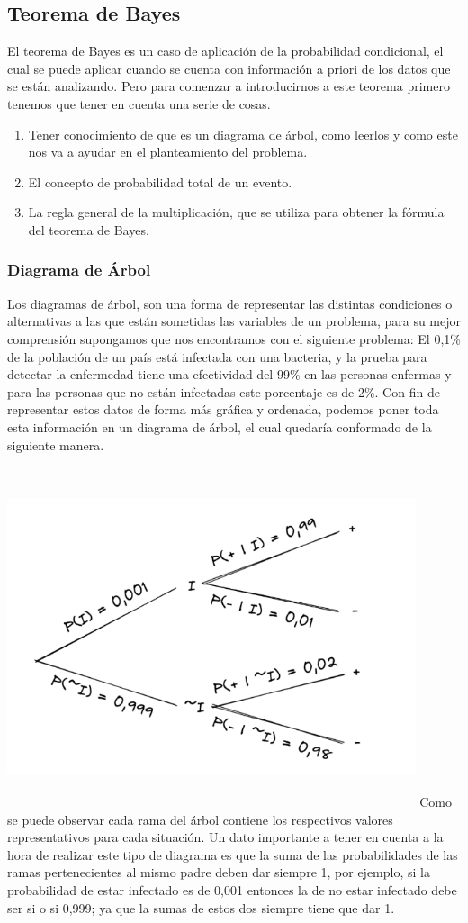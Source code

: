 \documentclass[]{article}
\begin{document}
\subsection{Teorema de Bayes}
El teorema de Bayes es un caso de aplicación de la probabilidad condicional, el cual se puede aplicar cuando se cuenta con información a priori de los datos que se están analizando. Pero para comenzar a introducirnos a este teorema primero tenemos que tener en cuenta una serie de cosas.
\begin{enumerate}
	\item Tener conocimiento de que es un diagrama de árbol, como leerlos y como este nos va a ayudar en el planteamiento del problema.
	\item El concepto de probabilidad total de un evento.
	\item La regla general de la multiplicación, que se utiliza para obtener la fórmula del teorema de Bayes.
\end{enumerate}
\subsubsection*{Diagrama de Árbol}
Los diagramas de árbol, son una forma de representar las distintas condiciones o alternativas a las que están sometidas las variables de un problema, para su mejor comprensión supongamos que nos encontramos con el siguiente problema:
El 0,1\% de la población de un país está infectada con una bacteria, y la prueba para detectar la enfermedad tiene una efectividad del 99\% en las personas enfermas y para las personas que no están infectadas este porcentaje es de 2\%.
Con fin de representar estos datos de forma más gráfica y ordenada, podemos poner toda esta información en un diagrama de árbol, el cual quedaría conformado de la siguiente manera.

\includegraphics[width=12cm, height=10cm]{imagenes/diagrama_arbol.png}
Como se puede observar cada rama del árbol contiene los respectivos valores representativos para cada situación. Un dato importante a tener en cuenta a la hora de realizar este tipo de diagrama es que la suma de las probabilidades de las ramas pertenecientes al mismo padre deben dar siempre 1, por ejemplo, si la probabilidad de estar infectado es de 0,001 entonces la de no estar infectado debe ser si o si 0,999; ya que la sumas de estos dos siempre tiene que dar 1.
\end{document}
